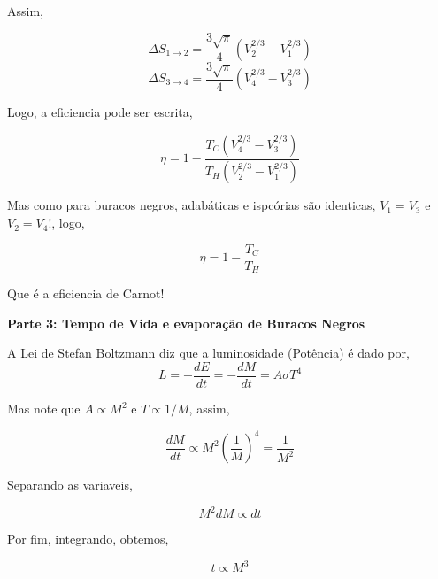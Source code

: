 \documentclass[11pt]{article}
\begin{document}
\begin{pproblem}
\begin{pssolution*}{}{}
\begin{alternativas}
            Assim, 

            \[\Delta S_{1\rightarrow 2} = \frac{3\sqrt\pi}{4}\left(V^{2/3}_2 - V^{2/3}_1\right)\]
            \[\Delta S_{3\rightarrow 4} = \frac{3\sqrt\pi}{4}\left(V^{2/3}_4 - V^{2/3}_3\right)\]

            Logo, a eficiencia pode ser escrita, 

            \[\eta = 1 - \frac{T_C\left(V^{2/3}_4 - V^{2/3}_3\right)}{T_H \left(V^{2/3}_2 - V^{2/3}_1\right)}\]

            Mas como para buracos negros, adabáticas e ispcórias são identicas, \(V_1=V_3\) e \(V_2=V_4\)!, logo, 

            \[\boxed{\eta = 1 -\frac{T_C}{T_H}}\]

            Que é a eficiencia de Carnot!

            \begin{center}
                \textbf{Parte 3: Tempo de Vida e evaporação de Buracos Negros}
            \end{center}
        \end{alternativas}
        \begin{alternativas}
            \item A Lei de Stefan Boltzmann diz que a luminosidade (Potência) é dado por, 
            \[L = -\frac{dE}{dt} = - \frac{dM}{dt} = A\sigma T^4 \]

            Mas note que \(A\propto M^2\) e \(T\propto 1/M\), assim, 

            \[\frac{dM}{dt} \propto M^2\left(\frac{1}{M}\right)^4 = \frac{1}{M^2}\]

            Separando as variaveis, 

            \[M^2dM \propto dt\]

            Por fim, integrando, obtemos, 

            \[\boxed{t \propto M^3}\]
        \end{alternativas}
    \end{pssolution*}


\end{pproblem}
\end{document}
